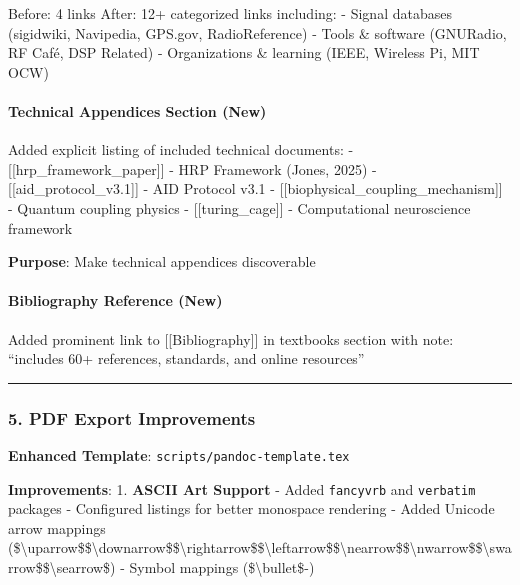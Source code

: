 Before: 4 links After: 12+ categorized links including: - Signal
databases (sigidwiki, Navipedia, GPS.gov, RadioReference) - Tools \&
software (GNURadio, RF Café, DSP Related) - Organizations \& learning
(IEEE, Wireless Pi, MIT OCW)

\paragraph{Technical Appendices Section
(New)}\label{technical-appendices-section-new}

Added explicit listing of included technical documents: -
{[}{[}hrp\_framework\_paper{]}{]} - HRP Framework (Jones, 2025) -
{[}{[}aid\_protocol\_v3.1{]}{]} - AID Protocol v3.1 -
{[}{[}biophysical\_coupling\_mechanism{]}{]} - Quantum coupling physics
- {[}{[}turing\_cage{]}{]} - Computational neuroscience framework

\textbf{Purpose}: Make technical appendices discoverable

\paragraph{Bibliography Reference
(New)}\label{bibliography-reference-new}

Added prominent link to {[}{[}Bibliography{]}{]} in textbooks section
with note: ``includes 60+ references, standards, and online resources''

\begin{center}\rule{0.5\linewidth}{0.5pt}\end{center}

\subsubsection{5. PDF Export
Improvements}\label{pdf-export-improvements}

\textbf{Enhanced Template}: \texttt{scripts/pandoc-template.tex}

\textbf{Improvements}: 1. \textbf{ASCII Art Support} - Added
\texttt{fancyvrb} and \texttt{verbatim} packages - Configured listings
for better monospace rendering - Added Unicode arrow mappings
(\$\textbackslash uparrow\$\$\textbackslash downarrow\$\$\textbackslash rightarrow\$\$\textbackslash leftarrow\$\$\textbackslash nearrow\$\$\textbackslash nwarrow\$\$\textbackslash swarrow\$\$\textbackslash searrow\$)
- Symbol mappings (\$\textbackslash bullet\$-\textbar)

